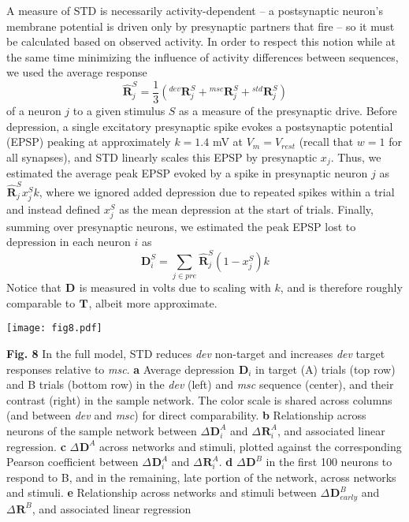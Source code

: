 \documentclass[pdflatex,referee,iicol,sn-basic]{sn-jnl}
\newcommand{\dev}{\textit{dev}}
\newcommand{\msc}{\textit{msc}}
\renewcommand{\R}[3][]{{}^{#1}_{}\mathbf{R}^{#2}_{#3}}
\renewcommand{\T}[3][]{{}^{#1}_{}\mathbf{T}^{#2}_{#3}}
\newcommand{\D}[3][]{{}^{#1}_{}\mathbf{D}^{#2}_{#3}}
\newcommand{\Rhat}[3][]{{}^{#1}_{}\mathbf{\widehat{R}}^{#2}_{#3}}
\begin{document}
A measure of STD is necessarily activity-dependent -- a postsynaptic neuron's membrane potential is driven only by presynaptic partners that fire -- so it must be calculated based on observed activity. In order to respect this notion while at the same time minimizing the influence of activity differences between sequences, we used the average response
\begin{equation}
    \Rhat{S}{j} = \frac{1}{3} (\R[dev]{S}{j} + \R[msc]{S}{j} + \R[std]{S}{j}) \label{eqn-Rhat}
\end{equation}
of a neuron $j$ to a given stimulus $S$ as a measure of the presynaptic drive. Before depression, a single excitatory presynaptic spike evokes a postsynaptic potential (EPSP) peaking at approximately $k = 1.4$ mV at $V_m = V_{rest}$ (recall that $w = 1$ for all synapses), and STD linearly scales this EPSP by presynaptic $x_j$. Thus, we estimated the average peak EPSP evoked by a spike in presynaptic neuron $j$ as $\Rhat{S}{j} x_j^S k$, where we ignored added depression due to repeated spikes within a trial and instead defined $x_j^S$ as the mean depression at the start of trials. Finally, summing over presynaptic neurons, we estimated the peak EPSP lost to depression in each neuron $i$ as
\begin{equation}
    \D{S}{i} = \sum_{j \in pre} \Rhat{S}{j} (1-x_j^S) k \label{eqn-D}
\end{equation}
Notice that $\D{}{}$ is measured in volts due to scaling with $k$, and is therefore roughly comparable to $\T{}{}$, albeit more approximate.

\begin{figure*}%
    \centering
    \texttt{[image: fig8.pdf]}
    \caption{}
    \label{fig8}
\end{figure*}
\textbf{Fig. 8} In the full model, STD reduces \dev{} non-target and increases \dev{} target responses relative to \msc{}.
\textbf{a} Average depression $\D{}{i}$ in target (A) trials (top row) and B trials (bottom row) in the \dev{} (left) and \msc{} sequence (center), and their contrast (right) in the sample network. The color scale is shared across columns (and between \dev{} and \msc{}) for direct comparability.
\textbf{b} Relationship across neurons of the sample network between $\Delta \D{A}{i}$ and $\Delta \R{A}{i}$, and associated linear regression.
\textbf{c} $\Delta \D{A}{}$ across networks and stimuli, plotted against the corresponding Pearson coefficient between $\Delta \D{A}{i}$ and $\Delta \R{A}{i}$.
\textbf{d} $\Delta \D{B}{}$ in the first 100 neurons to respond to B, and in the remaining, late portion of the network, across networks and stimuli.
\textbf{e} Relationship across networks and stimuli between $\Delta \D{B}{early}$ and $\Delta \R{B}{}$, and associated linear regression
\end{document}
